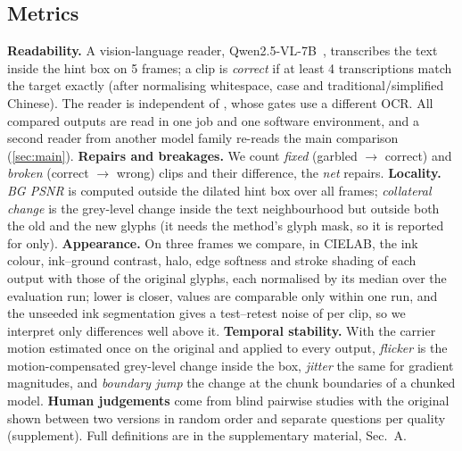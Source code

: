 \subsection{Metrics}
\label{sec:metrics}
\textbf{Readability.} A vision-language reader, Qwen2.5-VL-7B~\cite{bai2025qwen25vl}, transcribes the text inside the hint box on 5 frames; a clip is \emph{correct} if at least 4 transcriptions match the target exactly (after normalising whitespace, case and traditional/simplified Chinese). The reader is independent of \method, whose gates use a different OCR. All compared outputs are read in one job and one software environment, and a second reader from another model family re-reads the main comparison (\cref{sec:main}). \textbf{Repairs and breakages.} We count \emph{fixed} (garbled $\to$ correct) and \emph{broken} (correct $\to$ wrong) clips and their difference, the \emph{net} repairs. \textbf{Locality.} \emph{BG PSNR} is computed outside the dilated hint box over all frames; \emph{collateral change} is the grey-level change inside the text neighbourhood but outside both the old and the new glyphs (it needs the method's glyph mask, so it is reported for \method only). \textbf{Appearance.} On three frames we compare, in CIELAB, the ink colour, ink--ground contrast, halo, edge softness and stroke shading of each output with those of the original glyphs, each normalised by its median over the evaluation run; lower is closer, values are comparable only within one run, and the unseeded ink segmentation gives a test--retest noise of \rRetestSD{} per clip, so we interpret only differences well above it. \textbf{Temporal stability.} With the carrier motion estimated once on the original and applied to every output, \emph{flicker} is the motion-compensated grey-level change inside the box, \emph{jitter} the same for gradient magnitudes, and \emph{boundary jump} the change at the chunk boundaries of a chunked model. \textbf{Human judgements} come from blind pairwise studies with the original shown between two versions in random order and separate questions per quality (supplement). Full definitions are in the supplementary material, Sec.~A.
